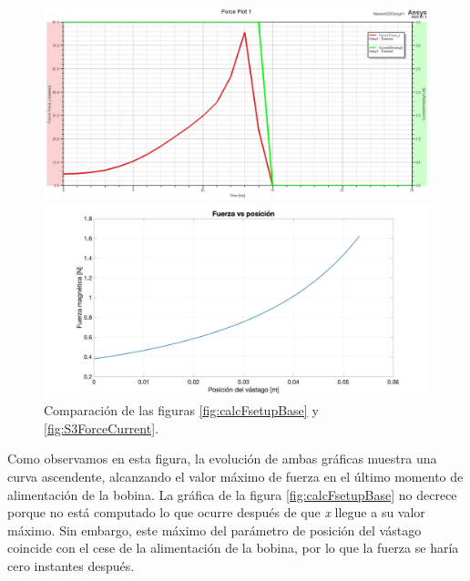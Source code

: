 \begin{figure}[htbp]
    \centering
    \begin{minipage}{0.85\textwidth}
        \centering
        \includegraphics[width=\textwidth]{FigurasMemoria/S3ForceCurrent.jpg}
    \end{minipage}
    \hfill
    \begin{minipage}{0.9\textwidth}
        \centering
        \includegraphics[width=\textwidth]{FigurasMemoria/calcFsetupBase.jpg}
    \end{minipage}
    \caption{Comparación de las figuras \ref{fig:calcFsetupBase} y \ref{fig:S3ForceCurrent}.}
    \label{fig:comparacionF}
\end{figure}

Como observamos en esta figura, la evolución de ambas gráficas muestra una curva ascendente, alcanzando el valor máximo de fuerza en el último momento de alimentación de la bobina. La gráfica de la figura \ref{fig:calcFsetupBase} no decrece porque no está computado lo que ocurre después de que \textit{x} llegue a su valor máximo. Sin embargo, este máximo del parámetro de posición del vástago coincide con el cese de la alimentación de la bobina, por lo que la fuerza se haría cero instantes después.

